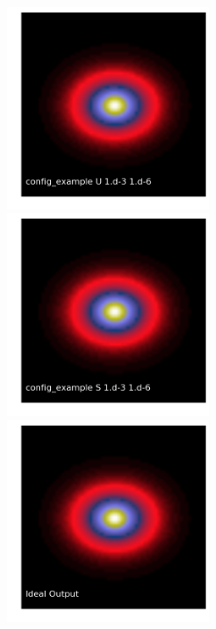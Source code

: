 \documentclass[12pt,preprint]{aastex6}
\begin{document}
\begin{figure}[!htbp]
\centering
\advance\leftskip-1.0cm
\advance\rightskip-1.0cm
\includegraphics[height=60mm,width=60mm]{f1a.png}
\includegraphics[height=60mm,width=60mm]{f1b.png}
\includegraphics[height=60mm,width=60mm]{f1c.png}

\end{figure}
\end{document}
